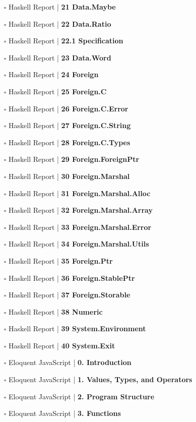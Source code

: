 \documentclass[a4, landscape, 12pt]{article}
\newcommand{\checkbox}{$\square$}%
\begin{document}
\begin{itemize}
{}
\item [\checkbox]  Haskell Report | \textbf{ 21 Data.Maybe
}
\item [\checkbox]  Haskell Report | \textbf{ 22 Data.Ratio
}
\item [\checkbox]  Haskell Report | \textbf{ 22.1 Specification
}
\item [\checkbox]  Haskell Report | \textbf{ 23 Data.Word
}
\item [\checkbox]  Haskell Report | \textbf{ 24 Foreign
}
\item [\checkbox]  Haskell Report | \textbf{ 25 Foreign.C
}
\item [\checkbox]  Haskell Report | \textbf{ 26 Foreign.C.Error
}
\item [\checkbox]  Haskell Report | \textbf{ 27 Foreign.C.String
}
\item [\checkbox]  Haskell Report | \textbf{ 28 Foreign.C.Types
}
\item [\checkbox]  Haskell Report | \textbf{ 29 Foreign.ForeignPtr
}
\item [\checkbox]  Haskell Report | \textbf{ 30 Foreign.Marshal
}
\item [\checkbox]  Haskell Report | \textbf{ 31 Foreign.Marshal.Alloc
}
\item [\checkbox]  Haskell Report | \textbf{ 32 Foreign.Marshal.Array
}
\item [\checkbox]  Haskell Report | \textbf{ 33 Foreign.Marshal.Error
}
\item [\checkbox]  Haskell Report | \textbf{ 34 Foreign.Marshal.Utils
}
\item [\checkbox]  Haskell Report | \textbf{ 35 Foreign.Ptr
}
\item [\checkbox]  Haskell Report | \textbf{ 36 Foreign.StablePtr
}
\item [\checkbox]  Haskell Report | \textbf{ 37 Foreign.Storable
}
\item [\checkbox]  Haskell Report | \textbf{ 38 Numeric
}
\item [\checkbox]  Haskell Report | \textbf{ 39 System.Environment
}
\item [\checkbox]  Haskell Report | \textbf{ 40 System.Exit
}
\item [\checkbox]  Eloquent JavaScript | \textbf{ 0. Introduction
}
\item [\checkbox]  Eloquent JavaScript | \textbf{ 1. Values, Types, and Operators
}
\item [\checkbox]  Eloquent JavaScript | \textbf{ 2. Program Structure
}
\item [\checkbox]  Eloquent JavaScript | \textbf{ 3. Functions
}
\end{itemize}
\end{document}
